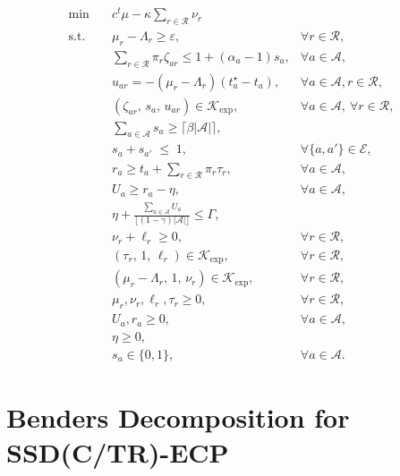 \documentclass[letter,11pt, reqno]{amsart}
\def\A{\mathcal{A}}
\def\RR{\mathcal{R}}
\begin{document}
\setlength{\abovedisplayskip}{6pt}
\setlength{\belowdisplayskip}{6pt}
\setlength{\abovedisplayshortskip}{4pt}
\setlength{\belowdisplayshortskip}{4pt}

\begin{align}\tag*{\rm SSD(C/TR)-ECP}\label{SSD(C/TR)-ECP}
\min \quad
& c^{t}\mu - \kappa \sum_{r\in\mathcal{R}} \nu_r
\nonumber\\
\text{s.t.}\quad
& \mu_r - \Lambda_r \ge \varepsilon, &\forall r\in\mathcal{R},
\label{ctr:1}\\
& \sum_{r\in\RR} \pi_r \zeta_{ar}
\le 1 + (\alpha_a-1)s_a, & \forall a\in\mathcal{A},\nonumber
\\
& u_{ar} = -(\mu_r-\Lambda_r)(t_a^\star-t_a), & \forall a\in\mathcal{A}, r \in \RR,\label{ctr:u}\\
&(\zeta_{ar},\, s_a,\,
u_{ar})
\in \mathcal{K}_{\exp},& \forall a\in\mathcal{A},\ \forall r\in\mathcal{R},\nonumber\\
&\sum_{a\in\mathcal{A}} s_a \ge \lceil \beta |\mathcal{A}| \rceil,\nonumber\\
& s_a + s_{a'} \;\le\; 1, &\forall \{a,a'\}\in\mathcal{E},
\nonumber\\
& r_a \ge t_a + \sum_{r\in\mathcal{R}} \pi_r \tau_r, & \forall a\in\mathcal{A},
\label{ctr:6}\\
& U_a \ge r_a - \eta, &\forall a\in\mathcal{A},
\label{ctr:7}\\
& \eta + \frac{\sum_{a\in\mathcal{A}} U_a}{\lfloor (1-\gamma)|\A|\rfloor} \le \Gamma,
\label{ctr:8}\\
& \nu_r + \ell_r \ge 0, & \forall r\in\mathcal{R},
\label{ctr:9}\\
& (\tau_r,\,1,\,\ell_r) \in \mathcal{K}_{\exp},
&\forall r\in\mathcal{R},\label{ctr:9b}\\
& (\mu_r-\Lambda_r,\,1,\,\nu_r)
\in \mathcal{K}_{\exp}, & \forall r\in\mathcal{R},\label{ctr:10}\\
& \mu_r, \nu_r, \ell_r, \tau_r \geq 0, & \forall r \in \RR,\nonumber\\
& U_a, r_a \geq 0, & \forall a \in \A,\nonumber\\
& \eta \geq 0, \nonumber\\
& s_a \in \{0,1\}, & \forall a\in\mathcal{A}.\nonumber
\end{align}
\setlength{\abovedisplayskip}{10pt}
\setlength{\belowdisplayskip}{10pt}

\section{Benders Decomposition for SSD(C/TR)-ECP}
\label{app:benders}
\end{document}
